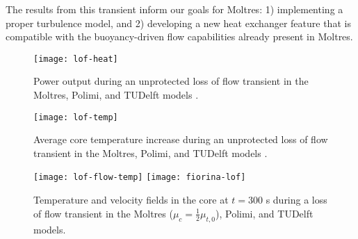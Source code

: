 The results from this transient inform our goals for Moltres: 1)
implementing a proper turbulence model, and
2) developing a new heat exchanger feature that is compatible with the
buoyancy-driven flow capabilities already present in Moltres.

\begin{figure}[htbp!]
    \centering
    \texttt{[image: lof-heat]}
    \caption{Power output during
    an unprotected loss of flow transient in the Moltres, Polimi, and
    TUDelft models \cite{fiorina_modelling_2014}.}
    \label{fig:lofheat}
    \texttt{[image: lof-temp]}
    \caption{Average core temperature increase during
    an unprotected loss of flow transient in the Moltres, Polimi, and
    TUDelft models \cite{fiorina_modelling_2014}.}
    \label{fig:loftemp}
\end{figure}

\clearpage

\begin{figure}[htbp!]
    \centering
    \texttt{[image: lof-flow-temp]}
    \texttt{[image: fiorina-lof]}
    \caption{Temperature and velocity fields in the core at $t=300$ s during
    a loss of flow transient in the Moltres ($\mu_c = \frac{1}{2} \mu_{t,0}$),
    Polimi, and TUDelft models.}
    \label{fig:lofflowtemp}
\end{figure}
